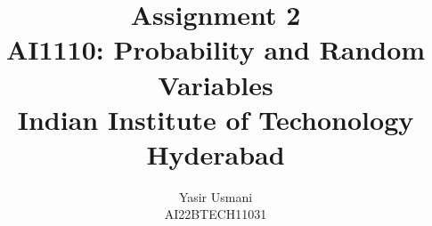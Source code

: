 \documentclass[journal,12pt,onecolumn]{IEEEtran}
\begin{document}
\let\vec\mathbf
\vspace{3cm}
\title{
\textbf {Assignment 2}\\ \large \textbf{AI1110}: Probability and Random Variables\\Indian Institute of Techonology Hyderabad
}
\author{Yasir Usmani\\AI22BTECH11031%
 }
%
%
%
% 
%
\end{document}

